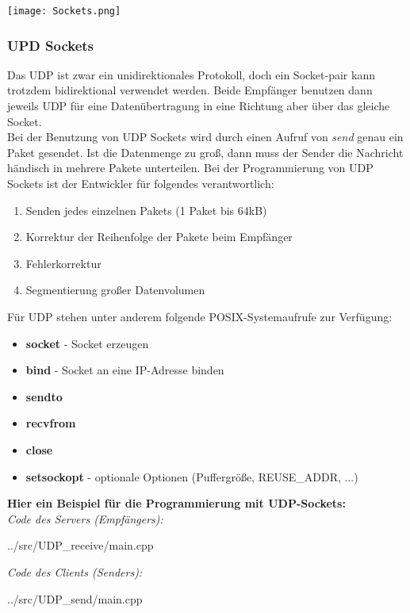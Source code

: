 \texttt{[image: Sockets.png]}

\subsubsection{UPD Sockets}
Das UDP ist zwar ein unidirektionales Protokoll, doch ein Socket-pair kann trotzdem bidirektional verwendet werden. Beide Empfänger benutzen dann jeweils UDP für eine Datenübertragung in eine Richtung aber über das gleiche Socket.\\
Bei der Benutzung von UDP Sockets wird durch einen Aufruf von \textit{send} genau ein Paket gesendet. Ist die Datenmenge zu groß, dann muss der Sender die Nachricht händisch in mehrere Pakete unterteilen.
Bei der Programmierung von UDP Sockets ist der Entwickler für folgendes verantwortlich:
\begin{enumerate}
    \item Senden jedes einzelnen Pakets (1 Paket bis 64kB)
    \item Korrektur der Reihenfolge der Pakete beim Empfänger
    \item Fehlerkorrektur
    \item Segmentierung großer Datenvolumen
\end{enumerate}
Für UDP stehen unter anderem folgende POSIX-Systemaufrufe zur Verfügung:
\begin{itemize}
    \item \textbf{socket} - Socket erzeugen
    \item \textbf{bind} - Socket an eine IP-Adresse binden
    \item \textbf{sendto}
    \item \textbf{recvfrom}
    \item \textbf{close}
    \item \textbf{setsockopt} - optionale Optionen (Puffergröße, REUSE\_ADDR, ...)
\end{itemize}

\newpage
\textbf{Hier ein Beispiel für die Programmierung mit UDP-Sockets:}\\

\textit{Code des Servers (Empfängers):}
\begin{lstinputlisting}[language=C++]
    {../src/UDP_receive/main.cpp}
\end{lstinputlisting}
\newpage
\textit{Code des Clients (Senders):}
\begin{lstinputlisting}[language=C++]
    {../src/UDP_send/main.cpp}
\end{lstinputlisting}


